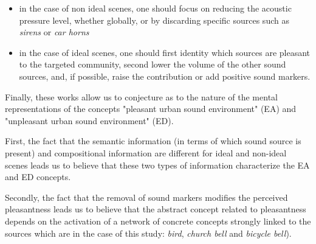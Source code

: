 \documentclass[twoside,twocolumn]{article}
\begin{document}
\begin{itemize}
\item in the case of non ideal scenes, one should focus on reducing the acoustic pressure level, whether globally, or by discarding specific sources such as \emph{sirens} or \emph{car horns}
\item in the case of ideal scenes, one should first identity which sources are pleasant to the targeted community, second lower the volume of the other sound sources, and, if possible, raise the contribution or add positive sound markers.
\end{itemize}


Finally, these works allow us to conjecture as to the nature of the mental representations of the concepts "pleasant urban sound environment" (EA) and "unpleasant urban sound environment" (ED).


First, the fact that the semantic information (in terms of which sound source is present) and compositional information are different for ideal and non-ideal scenes leads us to believe that these two types of information characterize the EA and ED concepts.


Secondly, the fact that the removal of sound markers modifies the perceived pleasantness leads us to believe that the abstract concept related to pleasantness depends on the activation of a network of concrete concepts strongly linked to the sources which are in the case of this study: \emph{bird}, \emph{church bell} and \emph{bicycle bell}).

\end{document}
